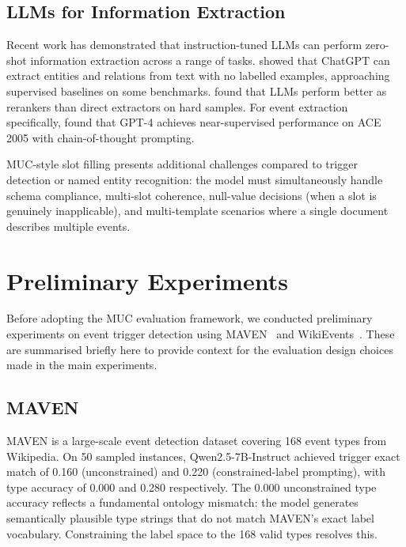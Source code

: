 \documentclass[11pt,a4paper]{article}
\begin{document}
\subsection{LLMs for Information Extraction}

Recent work has demonstrated that instruction-tuned LLMs can perform zero-shot information extraction across a range of tasks. \citet{wei2023zero} showed that ChatGPT can extract entities and relations from text with no labelled examples, approaching supervised baselines on some benchmarks. \citet{ma2023large} found that LLMs perform better as rerankers than direct extractors on hard samples. For event extraction specifically, \citet{gao2023exploring} found that GPT-4 achieves near-supervised performance on ACE 2005 with chain-of-thought prompting.

MUC-style slot filling presents additional challenges compared to trigger detection or named entity recognition: the model must simultaneously handle schema compliance, multi-slot coherence, null-value decisions (when a slot is genuinely inapplicable), and multi-template scenarios where a single document describes multiple events.

\section{Preliminary Experiments}
\label{sec:preliminary}

Before adopting the MUC evaluation framework, we conducted preliminary experiments on event trigger detection using MAVEN~\cite{wang2020maven} and WikiEvents~\cite{li2021document}. These are summarised briefly here to provide context for the evaluation design choices made in the main experiments.

\subsection{MAVEN}

MAVEN is a large-scale event detection dataset covering 168 event types from Wikipedia. On 50 sampled instances, Qwen2.5-7B-Instruct achieved trigger exact match of 0.160 (unconstrained) and 0.220 (constrained-label prompting), with type accuracy of 0.000 and 0.280 respectively. The 0.000 unconstrained type accuracy reflects a fundamental ontology mismatch: the model generates semantically plausible type strings that do not match MAVEN's exact label vocabulary. Constraining the label space to the 168 valid types resolves this.
\end{document}
